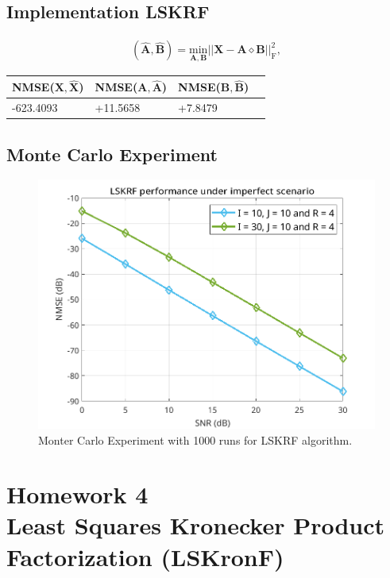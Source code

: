 \documentclass[a4paper,10pt]{article}
\begin{document}
    \subsection*{Implementation LSKRF}

    \begin{align}
        \left(\hat{\boldsymbol{A}}, \hat{\boldsymbol{B}}\right) = \underset{\boldsymbol{A}, \boldsymbol{B}}{\text{min}} \left|\left| \boldsymbol{X} - \boldsymbol{A} \diamond \boldsymbol{B} \right|\right|^2_{\text{F}},
    \end{align}

    \begin{table}[ht!]
        \centering
        \begin{tabular}{|l|l|l|l|}
        \hline
        NMSE($\boldsymbol{X}, \boldsymbol{\hat{X}}$) & NMSE($\boldsymbol{A}, \boldsymbol{\hat{A}}$) & NMSE($\boldsymbol{B}, \boldsymbol{\hat{B}}$) \\ \hline
        -623.4093 & +11.5658 & +7.8479 \\ \hline
        \end{tabular}
    \end{table}

    \subsection*{Monte Carlo Experiment}

    \begin{figure}[ht!]
        \centering 
        \includegraphics[width=0.75\linewidth]{figs/hw3.png} \par 
        \caption{Monter Carlo Experiment with 1000 runs for LSKRF algorithm.}
        \label{fig:hw3} 
    \end{figure}

\newpage
\section*{Homework 4 \\ Least Squares Kronecker Product Factorization (LSKronF)}
\end{document}

